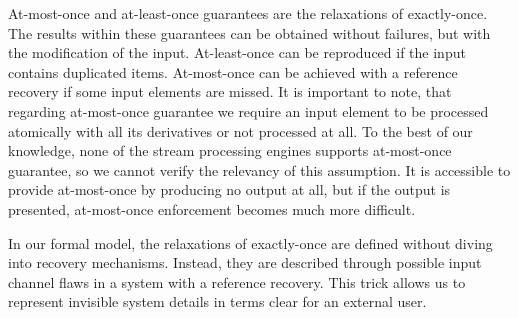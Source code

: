 At-most-once and at-least-once guarantees are the relaxations of exactly-once. The results within these guarantees can be obtained without failures, but with the modification of the input. At-least-once can be reproduced if the input contains duplicated items. At-most-once can be achieved with a reference recovery if some input elements are missed. It is important to note, that regarding at-most-once guarantee we require an input element to be processed atomically with all its derivatives or not processed at all. To the best of our knowledge, none of the stream processing engines supports at-most-once guarantee, so we cannot verify the relevancy of this assumption. It is accessible to provide at-most-once by producing no output at all, but if the output is presented, at-most-once enforcement becomes much more difficult.  

In our formal model, the relaxations of exactly-once are defined without diving into recovery mechanisms. Instead, they are described through possible input channel flaws in a system with a reference recovery. This trick allows us to represent invisible system details in terms clear for an external user.

